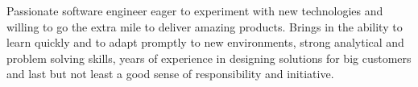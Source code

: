 
\begin{cvparagraph}

Passionate software engineer eager to experiment with new technologies and willing to go the extra mile to deliver amazing products.
Brings in the ability to learn quickly and to adapt promptly to new environments, strong analytical and problem solving skills, years of experience in designing solutions for big customers and last but not least a good sense of responsibility and initiative.
\end{cvparagraph}
